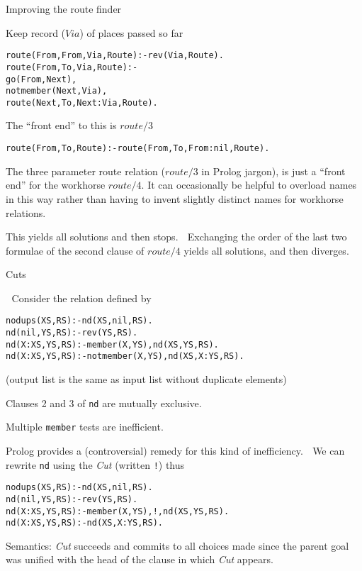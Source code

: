 \documentclass{popl}
\newenvironment{smalltt}{\begin{alltt}\smaller}{\end{alltt}}
\begin{document}
\begin{foil}
Improving the route finder


Keep record ($Via$) of places passed so far 
\begin{smalltt}
        route(From, From, Via, Route) :- rev(Via, Route).
        route(From, To,   Via, Route) :-
                go(From, Next), 
                not member(Next, Via),
                route(Next, To, Next:Via, Route).
\end{smalltt}

The ``front end'' to this is $route/3$
\begin{smalltt}
        route(From, To, Route) :- route(From, To, From:nil, Route).
\end{smalltt}
\begin{note}
The three parameter route relation ($route/3$ in Prolog jargon), is
just a ``front end'' for the workhorse $route/4$. It can occasionally
be helpful to overload names in this way rather than having to invent slightly distinct
names for workhorse relations.
\end{note}

This yields all solutions and then stops.

Exchanging the order of the last two formulae of the second clause of $route/4$
yields all solutions, and then diverges.
\end{foil}



\begin{foil} 
\begin{cframed}
Cuts
\end{cframed}

Consider the relation defined by
\begin{smalltt}
nodups(XS,   RS)  :- nd(XS, nil, RS).
nd(nil,  YS, RS)  :- rev(YS, RS).
nd(X:XS, YS, RS)  :- member(X, YS),     nd(XS, YS, RS).
nd(X:XS, YS, RS)  :- not member(X, YS), nd(XS, X:YS, RS).
\end{smalltt}
(output list is the same as input list without duplicate elements)

Clauses 2 and  3 of {\tt nd} are mutually exclusive.

Multiple {\tt member} tests are inefficient.

Prolog provides a (controversial) remedy for this kind of inefficiency.

We can rewrite {\tt nd} using the  {\it Cut} (written {\tt !}) thus
\begin{smalltt}
nodups(XS,   RS)  :- nd(XS, nil, RS).
nd(nil,  YS, RS)  :- rev(YS, RS).
nd(X:XS, YS, RS)  :- member(X, YS), !, nd(XS, YS, RS).
nd(X:XS, YS, RS)  :- nd(XS, X:YS, RS).
\end{smalltt}

Semantics: {\it Cut} succeeds and commits to all choices made since the
parent goal was unified with the head of the clause in which {\it Cut} appears.
\end{foil}
\end{document}
